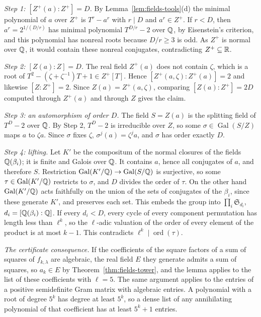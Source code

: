 \emph{Step 1: $[Z^+(a):Z^+]=D$.} By Lemma~\ref{lem:fields-tools}(d) the
minimal polynomial of $a$ over $Z^+$ is $T^r-a^r$ with $r\mid D$ and
$a^r\in Z^+$. If $r<D$, then $a^r=2^{1/(D/r)}$ has minimal polynomial
$T^{D/r}-2$ over $\mathbb Q$, by Eisenstein's criterion, and this polynomial has
nonreal roots because $D/r\ge3$ is odd. As $Z^+$ is normal over $\mathbb Q$, it
would contain these nonreal conjugates, contradicting $Z^+\subseteq\mathbb R$.

\emph{Step 2: $[Z(a):Z]=D$.} The real field $Z^+(a)$ does not contain
$\zeta$, which is a root of $T^2-(\zeta+\zeta^{-1})T+1\in Z^+[T]$. Hence
$[Z^+(a,\zeta):Z^+(a)]=2$ and likewise $[Z:Z^+]=2$. Since
$Z(a)=Z^+(a,\zeta)$, comparing $[Z(a):Z^+]=2D$ computed through $Z^+(a)$
and through $Z$ gives the claim.

\emph{Step 3: an automorphism of order $D$.} The field $S=Z(a)$ is the
splitting field of $T^D-2$ over $\mathbb Q$. By Step 2, $T^D-2$ is irreducible over
$Z$, so some $\sigma\in\operatorname{Gal}(S/Z)$ maps $a$ to $\zeta a$. Since
$\sigma$ fixes $\zeta$, $\sigma^j(a)=\zeta^ja$, and $\sigma$ has order
exactly $D$.

\emph{Step 4: lifting.} Let $K'$ be the compositum of the normal closures of
the fields $\mathbb Q(\beta_i)$; it is finite and Galois over $\mathbb Q$. It contains
$a$, hence all conjugates of $a$, and therefore $S$. Restriction
$\operatorname{Gal}(K'/\mathbb Q)\to\operatorname{Gal}(S/\mathbb Q)$ is surjective, so
some $\tau\in\operatorname{Gal}(K'/\mathbb Q)$ restricts to $\sigma$, and $D$
divides the order of $\tau$. On the other hand $\operatorname{Gal}(K'/\mathbb Q)$
acts faithfully on the union of the sets of conjugates of the $\beta_i$,
since these generate $K'$, and preserves each set. This embeds the group
into $\prod_i\mathfrak S_{d_i}$, $d_i=[\mathbb Q(\beta_i):\mathbb Q]$. If every $d_i<D$,
every cycle of every component permutation has length less than $\ell^k$,
so the $\ell$-adic valuation of the order of every element of the product is
at most $k-1$. This contradicts $\ell^k\mid\operatorname{ord}(\tau)$.

\emph{The certificate consequence.} If the coefficients of the square
factors of a sum of squares of $f_{k,\lambda}$ are algebraic, the real field
$E$ they generate admits a sum of squares, so $a_k\in E$ by
Theorem~\ref{thm:fields-tower}, and the lemma applies to the list of these
coefficients with $\ell=5$. The same argument applies to the entries of a
positive semidefinite Gram matrix with algebraic entries. A polynomial with a
root of degree $5^k$ has degree at least $5^k$, so a dense list of any
annihilating polynomial of that coefficient has at least $5^k+1$ entries.

